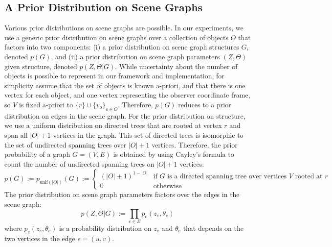 \subsection{A Prior Distribution on Scene Graphs}  %
Various prior distributions on scene graphs are possible.
In our experiments, we use a generic prior distribution on scene graphs over a collection of objects $O$ that factors into two components:
(i) a prior distribution on scene graph structures $G$, denoted $p(G)$, and
(ii) a prior distribution on scene graph parameters $(Z, \Theta)$ given structure, denoted $p(Z, \Theta | G)$.
While uncertainty about the number of objects is possible to represent in our framework and implementation, for simplicity assume that the set of objects is known a-priori, and that there is one vertex for each object, and one vertex representing the observer coordinate frame, so $V$ is fixed a-priori to $\{r\} \cup \{v_o\}_{o \in O}$.
Therefore, $p(G)$ reduces to a prior distribution on edges in the scene graph.
For the prior distribution on structure, we use a uniform distribution on directed trees that are rooted at vertex $r$ and span all $|O| + 1$ vertices in the graph.
This set of directed trees is isomorphic to the set of undirected spanning trees over $|O| + 1$ vertices.
Therefore, the prior probability of a graph $G = (V, E)$ is obtained by using Cayley's formula to count the number of undirected spanning trees on $|O| +1$ vertices:
\begin{equation}
    p(G) := p_{\mathrm{unif}(|O|)}(G) := \left\{
    \begin{array}{ll}
    (|O| + 1)^{1 - |O|} & \mbox{if $G$ is a directed spanning tree over vertices $V$ rooted at $r$}\\
    0 & \mbox{otherwise}
    \end{array}
    \right.
\end{equation}
The prior distribution on scene graph parameters factors over the edges in the scene graph:
\begin{equation}
    p(Z, \Theta | G) := \prod_{e \in E} p_e(z_e, \theta_e)
\end{equation}
where $p_e(z_e, \theta_e)$ is a probability distribution on $z_e$ and $\theta_e$ that depends on the two vertices in the edge $e = (u, v)$.
